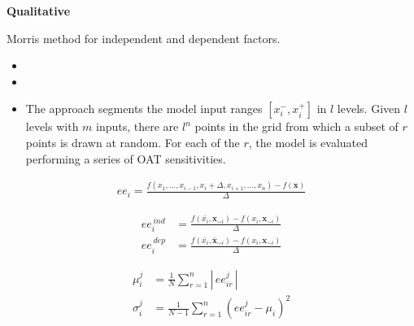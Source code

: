 \begin{frame}\begin{center}
		\LARGE\textbf{Qualitative}
\end{center}\end{frame}
\begin{frame} Morris method for independent and dependent factors.

\begin{itemize}\setlength\itemsep{1em}
  \item {}
  \item {}
\end{itemize}

\end{frame}
\begin{frame}

		\begin{itemize}
			\item  The approach segments the model input ranges $[x^-_i, x^+_i]$ in $l$ levels. Given $l$ levels with $m$ inputs, there are $l^n$ points in the grid from which a subset of $r$ points is drawn at random. For each of the $r$, the model is evaluated performing a series of OAT sensitivities.
		\end{itemize}

\end{frame}

\begin{frame}
	\begin{align*}
	  ee_i = \frac{f(x_1, \hdots, x_{i - 1}, x_i + \Delta, x_{i + 1}, \hdots, x_n) - f(\textbf{x})}{\Delta}
	\end{align*}
\end{frame}


\begin{frame}
	\begin{align*}
	ee^{\,ind}_i & = \frac{f(\bar{x_i}, \textbf{x}_{\sim i})- f(x_i, \textbf{x}_{\sim i})}{\Delta} \\
	ee^{\,dep}_i & = \frac{f(\bar{x_i}, \bar{\textbf{x}}_{\sim i})- f(x_i, \textbf{x}_{\sim i})}{\Delta}
	\end{align*}
\end{frame}

\begin{frame}
	\begin{align*}
	  \mu^j_i    & = \frac{1}{N}\sum_{r = 1}^n |\, ee^j_{ir}\,| \\
	  \sigma^j_i & = \frac{1}{N - 1}\sum_{r = 1}^n (ee^j_{ir} - \mu_i)^2
	\end{align*}

\end{frame}
